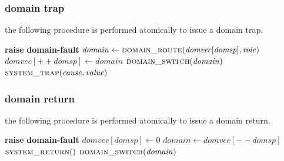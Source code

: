 \subsubsection{domain trap}

\par\noindent
the following procedure is performed atomically to issue a domain trap.

\begin{algorithm}[H]
\footnotesize
\caption{context switch to a domain and execute its trap handler}
\begin{algorithmic}[1]
        \State \textbf{raise} \textbf{domain-fault}
    \EndIf
    \State $\mathit{domain} \gets \Call{domain\_route}{\mathit{domvec[domsp]},\mathit{role}}$
    \State $\mathit{domvec}[{+\!+}\mathit{domsp}] \gets \mathit{domain}$
    \State $\Call{domain\_switch}{\mathit{domain}}$
    \State $\Call{system\_trap}{\mathit{cause},\mathit{value}}$
\EndFunction
\end{algorithmic}
\end{algorithm}

\subsubsection{domain return}

\par\noindent
the following procedure is performed atomically to issue a domain return.

\begin{algorithm}[H]
\footnotesize
\caption{return to the calling domain at the point of exception}
\begin{algorithmic}[1]
        \State \textbf{raise} \textbf{domain-fault}
    \EndIf
    \State $\mathit{domvec[domsp]} \gets 0$
    \State $\mathit{domain} \gets \mathit{domvec}[{-\!-}\mathit{domsp}]$
    \State $\Call{system\_return}{\mathit{}}$
    \State $\Call{domain\_switch}{\mathit{domain}}$
\EndFunction
\end{algorithmic}
\end{algorithm}

